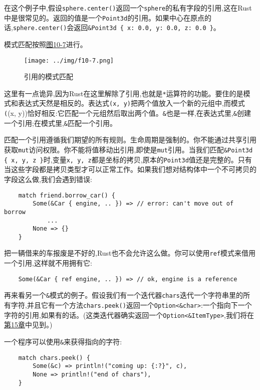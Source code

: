 在这个例子中,假设\texttt{sphere.center()}返回一个\texttt{sphere}的私有字段的引用,这在Rust中是很常见的。返回的值是一个\texttt{Point3d}的引用。如果中心在原点的话,\texttt{sphere.center()}会返回\texttt{\&Point3d \{ x: 0.0, y: 0.0, z: 0.0 \}}。

模式匹配按照\hyperref[f10-7]{图10-7}进行。

\begin{figure}[htbp]
    \centering
    \texttt{[image: ../img/f10-7.png]}
    \caption{引用的模式匹配}
    \label{f10-7}
\end{figure}

这里有一点诡异,因为Rust在这里解除了引用,也就是\texttt{*}运算符的功能。要住的是模式和表达式天然是相反的。表达式\texttt{(x, y)}把两个值放入一个新的元组中,而模式\texttt((x, y))恰好相反:它匹配一个元组然后取出两个值。\texttt{\&}也是一样,在表达式里,\texttt{\&}创建一个引用;在模式里,\texttt{\&}匹配一个引用。

匹配一个引用遵循我们期望的所有规则。生命周期是强制的。你不能通过共享引用获取\texttt{mut}访问权限。你不能将值移动出引用,即使是\texttt{mut}引用。当我们匹配\texttt{\&Point3d \{ x, y, z \}}时,变量\texttt{x, y, z}都是坐标的拷贝,原本的\texttt{Point3d}值还是完整的。只有当这些字段都是拷贝类型才可以正常工作。如果我们想对结构体中一个不可拷贝的字段这么做,我们会遇到错误:
\begin{verbatim}
    match friend.borrow_car() {
        Some(&Car { engine, .. }) => // error: can't move out of borrow
            ...
        None => {}
    }
\end{verbatim}

把一辆借来的车报废是不好的,Rust也不会允许这么做。你可以使用\texttt{ref}模式来借用一个引用,这样就不用拥有它:
\begin{verbatim}
    Some(&Car { ref engine, .. }) => // ok, engine is a reference
\end{verbatim}

再来看另一个\texttt{\&}模式的例子。假设我们有一个迭代器\texttt{chars}迭代一个字符串里的所有字符,并且它有一个方法\texttt{chars.peek()}返回一个\texttt{Option<\&char>}:一个指向下一个字符的引用,如果有的话。(这类迭代器确实返回一个\texttt{Option<\&ItemType>},我们将在\hyperref[ch15]{第15章}中见到。)

一个程序可以使用\texttt{\&}来获得指向的字符:
\begin{verbatim}
    match chars.peek() {
        Some(&c) => println!("coming up: {:?}", c),
        None => println!("end of chars"),
    }
\end{verbatim}

